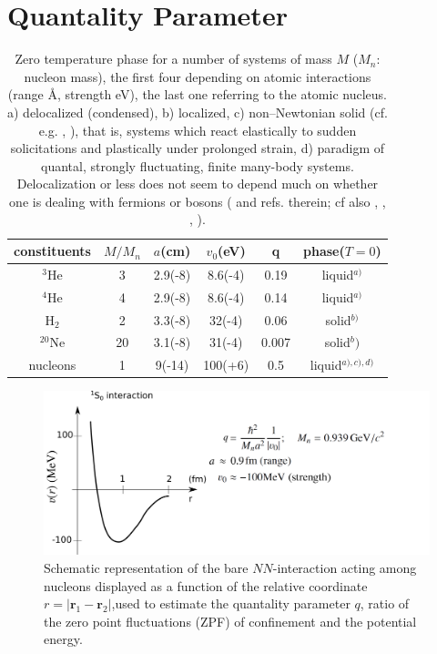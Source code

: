 \section{Quantality Parameter}\label{App1A}
\begin{table}
 \begin{tabular}{|c|c|c|c|c|c|}
 \hline \rule[-2ex]{0pt}{5.5ex}   constituents& $M/M_n$  & $a$(cm) &$v_0$(eV)  &q&phase($T=0$)    \\ 
 \hline \rule[-2ex]{0pt}{5.5ex}   $^{3}$He &3& 2.9(-8)  &8.6(-4)  &0.19  &liquid$^{a)}$    \\ 
 \hline \rule[-2ex]{0pt}{5.5ex}  $^{4}$He  &4&  2.9(-8)&  8.6(-4)&  0.14& liquid$^{a)}$   \\ 
 \hline \rule[-2ex]{0pt}{5.5ex}    H$_2$&2&  3.3(-8)&  32(-4)&  0.06&solid$^{b)}$   \\ 
 \hline \rule[-2ex]{0pt}{5.5ex}    $^{20}$Ne&20& 3.1(-8) &  31(-4)&  0.007&solid$^b)$    \\ 
 \hline \rule[-2ex]{0pt}{5.5ex}    nucleons&1&  9(-14)& 100(+6) &  0.5&liquid$^{a),c),d)}$  \\ 
 \hline 
 \end{tabular}
 \caption{Zero temperature phase for a number of systems of mass $M$ ($M_n$: nucleon mass), the first four depending on atomic interactions (range \AA, strength eV), the last one referring to the atomic nucleus. a) delocalized (condensed), b) localized, c) non--Newtonian solid (cf. e.g. \cite{Bertsch:88b}, \cite{DeGennes:94}), that is, systems which react elastically to sudden solicitations and plastically under prolonged strain, d) paradigm of quantal, strongly fluctuating, finite many-body  systems. Delocalization or less does not seem to depend much on whether one is dealing with fermions or bosons (\cite{Mottelson:02} and refs. therein; cf also \cite{Ebran:14}, \cite{Ebran:14b}, \cite{Ebran:13}, \cite{Ebran:12}).}\label{tab1A1}
 \end{table}
 \begin{figure}
 \centerline{\includegraphics*[width=13cm,angle=0]{nutshell/figs/potential.pdf}}
 \caption{Schematic representation of the bare $NN$-interaction acting among nucleons displayed as a function of the relative coordinate $r=|\mathbf{r}_1-\mathbf{r}_2|$,used to estimate the quantality parameter $q$, ratio of the zero point fluctuations (ZPF) of confinement and the potential energy.}\label{fig1A1}
 \end{figure}
